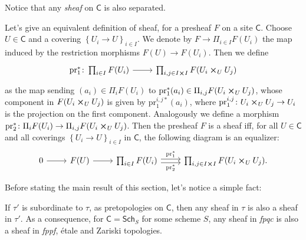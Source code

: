 \noindent
Notice that any {\em sheaf} on $\mathsf{C}$ is also separated.
\begin{rem}[]
	Let's give an equivalent definition of sheaf, for a presheaf
	$F$ on a site $\mathsf{C}$.
	Choose $U \in \mathsf{C}$ and a covering $\left\{ U_{ i } \to U \right\}_{ i \in I }$.
	We denote by $F \to \Pi_{i \in I} F(U_i)$ the map induced by the
	restriction morphisms $F(U) \to F(U_i)$.
	Then we define
	\begin{equation*}
	\begin{tikzcd}[row sep = 0ex
		,/tikz/column 1/.append style={anchor=base east}
		,/tikz/column 2/.append style={anchor=base west}]
		\mathrm{pr}_1^*\colon \prod_{i \in I} F(U_i) \arrow[r, "", rightarrow] &
		\prod_{i,j \in I \cross I} F( U_i \cross_{ U } U_j )
	\end{tikzcd}
	\end{equation*} 
	as the map sending $(a_i) \in \Pi_i F(U_i)$ to
	$\mathrm{pr}_1^*(a_i) \in \Pi_{i,j} F( U_i \cross_{ U } U_j )$,
	whose component in $F( U_i \cross_{ U } U_j )$ is given by $\mathrm{pr}_1^{i,j*}(a_i)$,
	where $\mathrm{pr}^{i,j}_1\colon U_i \cross_{ U } U_j \to U_i$ is the projection on the first
	component.
	Analogously we define a morphism $\mathrm{pr}_2^*\colon \Pi_i F(U_i) \to 
	\Pi_{i,j} F( U_i \cross_{ U } U_j )$.
	Then the presheaf $F$ is a sheaf iff, for all $U \in \mathsf{C}$ and all coverings
	$\left\{ U_{ i } \to U \right\}_{ i \in I }$ in $\mathsf{C}$,
	the following diagram is an equalizer:
	\begin{equation*}
	\begin{tikzcd}
		0 \arrow[r, "", rightarrow] &
		F(U) \arrow[r, "", rightarrow] &
		\prod_{i \in I} F(U_i) 
		\arrow[r, "\mathrm{pr}_1^*", rightarrow, shift left = 0.5ex] 
		\arrow[r, "\mathrm{pr}_2^*"', rightarrow, shift right = 0.5ex] &
		\prod_{i,j \in I \cross I} F( U_i \cross_{ U } U_j )
	.\end{tikzcd}
	\end{equation*}
\end{rem}


\noindent
Before stating the main result of this section, let's notice
a simple fact:
\begin{rem}[]
	If $\tau'$ is subordinate to $\tau$, as pretopologies on $\mathsf{C}$,
	then any sheaf in $\tau$ is also a sheaf in $\tau'$.
	As a consequence, for $\mathsf{C} = \mathsf{Sch}_{ S }$ for some scheme $S$,
	any sheaf in {\em fpqc} is also a sheaf in {\em fppf}, étale and Zariski topologies.
\end{rem}


